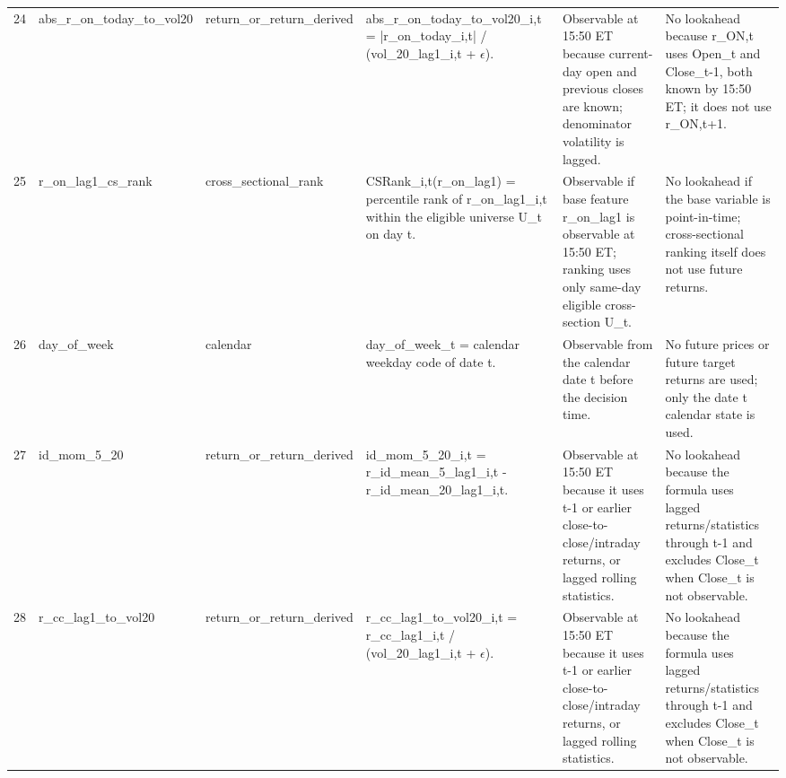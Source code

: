 \begin{landscape}
\begin{longtable}{P{0.42cm} P{2.25cm} P{2.05cm} P{5.25cm} P{4.85cm} P{5.25cm}}
24 & abs\_\allowbreak{}r\_\allowbreak{}on\_\allowbreak{}today\_\allowbreak{}to\_\allowbreak{}vol20 & return\_\allowbreak{}or\_\allowbreak{}return\_\allowbreak{}derived & abs\_\allowbreak{}r\_\allowbreak{}on\_\allowbreak{}today\_\allowbreak{}to\_\allowbreak{}vol20\_\allowbreak{}i,t = |r\_\allowbreak{}on\_\allowbreak{}today\_\allowbreak{}i,t| / (vol\_\allowbreak{}20\_\allowbreak{}lag1\_\allowbreak{}i,t + $\epsilon$). & Observable at 15:50 ET because current-day open and previous closes are known; denominator volatility is lagged. & No lookahead because r\_\allowbreak{}ON,t uses Open\_\allowbreak{}t and Close\_\allowbreak{}t-1, both known by 15:50 ET; it does not use r\_\allowbreak{}ON,t+1. \\
25 & r\_\allowbreak{}on\_\allowbreak{}lag1\_\allowbreak{}cs\_\allowbreak{}rank & cross\_\allowbreak{}sectional\_\allowbreak{}rank & CSRank\_\allowbreak{}i,t(r\_\allowbreak{}on\_\allowbreak{}lag1) = percentile rank of r\_\allowbreak{}on\_\allowbreak{}lag1\_\allowbreak{}i,t within the eligible universe U\_\allowbreak{}t on day t. & Observable if base feature r\_\allowbreak{}on\_\allowbreak{}lag1 is observable at 15:50 ET; ranking uses only same-day eligible cross-section U\_\allowbreak{}t. & No lookahead if the base variable is point-in-time; cross-sectional ranking itself does not use future returns. \\
26 & day\_\allowbreak{}of\_\allowbreak{}week & calendar & day\_\allowbreak{}of\_\allowbreak{}week\_\allowbreak{}t = calendar weekday code of date t. & Observable from the calendar date t before the decision time. & No future prices or future target returns are used; only the date t calendar state is used. \\
27 & id\_\allowbreak{}mom\_\allowbreak{}5\_\allowbreak{}20 & return\_\allowbreak{}or\_\allowbreak{}return\_\allowbreak{}derived & id\_\allowbreak{}mom\_\allowbreak{}5\_\allowbreak{}20\_\allowbreak{}i,t = r\_\allowbreak{}id\_\allowbreak{}mean\_\allowbreak{}5\_\allowbreak{}lag1\_\allowbreak{}i,t - r\_\allowbreak{}id\_\allowbreak{}mean\_\allowbreak{}20\_\allowbreak{}lag1\_\allowbreak{}i,t. & Observable at 15:50 ET because it uses t-1 or earlier close-to-close/intraday returns, or lagged rolling statistics. & No lookahead because the formula uses lagged returns/statistics through t-1 and excludes Close\_\allowbreak{}t when Close\_\allowbreak{}t is not observable. \\
28 & r\_\allowbreak{}cc\_\allowbreak{}lag1\_\allowbreak{}to\_\allowbreak{}vol20 & return\_\allowbreak{}or\_\allowbreak{}return\_\allowbreak{}derived & r\_\allowbreak{}cc\_\allowbreak{}lag1\_\allowbreak{}to\_\allowbreak{}vol20\_\allowbreak{}i,t = r\_\allowbreak{}cc\_\allowbreak{}lag1\_\allowbreak{}i,t / (vol\_\allowbreak{}20\_\allowbreak{}lag1\_\allowbreak{}i,t + $\epsilon$). & Observable at 15:50 ET because it uses t-1 or earlier close-to-close/intraday returns, or lagged rolling statistics. & No lookahead because the formula uses lagged returns/statistics through t-1 and excludes Close\_\allowbreak{}t when Close\_\allowbreak{}t is not observable. \\

\end{longtable}
\end{landscape}
